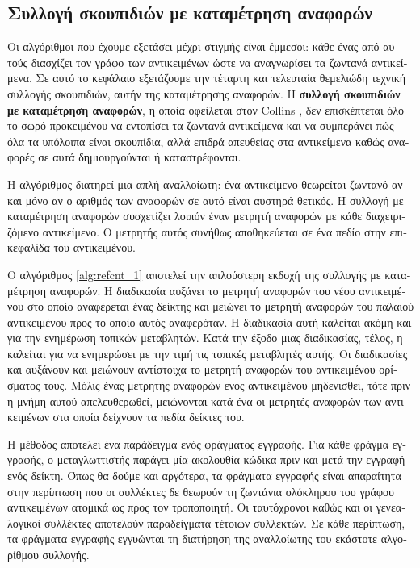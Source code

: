 \begin{greek}
\chapter{Συλλογή σκουπιδιών με καταμέτρηση αναφορών}\label{ch:refcnt}
Οι αλγόριθμοι που έχουμε εξετάσει μέχρι στιγμής είναι έμμεσοι:
κάθε ένας από αυτούς διασχίζει τον γράφο των αντικειμένων
ώστε να αναγνωρίσει τα ζωντανά αντικείμενα. Σε αυτό το κεφάλαιο
εξετάζουμε την τέταρτη και τελευταία θεμελιώδη τεχνική συλλογής
σκουπιδιών, αυτήν της καταμέτρησης αναφορών.  
Η \textbf{συλλογή σκουπιδιών με καταμέτρηση αναφορών}, η
οποία οφείλεται στον Collins \cite{DBLP:journals/cacm/Collins60},
δεν επισκέπτεται όλο το σωρό προκειμένου να εντοπίσει τα
ζωντανά αντικείμενα και να συμπεράνει πώς όλα τα υπόλοιπα
είναι σκουπίδια, αλλά επιδρά απευθείας στα αντικείμενα
καθώς αναφορές σε αυτά δημιουργούνται ή καταστρέφονται.

Η αλγόριθμος διατηρεί μια απλή αναλλοίωτη: ένα αντικείμενο
θεωρείται ζωντανό αν και μόνο αν ο αριθμός των αναφορών σε
αυτό είναι αυστηρά θετικός. Η συλλογή με καταμέτρηση αναφορών
συσχετίζει λοιπόν έναν μετρητή αναφορών με κάθε διαχειριζόμενο
αντικείμενο. Ο μετρητής αυτός συνήθως αποθηκεύεται σε ένα
πεδίο στην  επικεφαλίδα του αντικειμένου.

Ο αλγόριθμος \ref{alg:refcnt_1} αποτελεί την απλούστερη
εκδοχή της συλλογής με καταμέτρηση αναφορών. Η διαδικασία
\textenglish{} αυξάνει το μετρητή αναφορών του νέου
αντικειμένου στο οποίο αναφέρεται ένας δείκτης και μειώνει
το μετρητή αναφορών του παλαιού αντικειμένου προς το οποίο
αυτός αναφερόταν. Η διαδικασία αυτή καλείται ακόμη και για
την ενημέρωση τοπικών μεταβλητών. Κατά την έξοδο μιας
διαδικασίας, τέλος, η \textenglish{} καλείται για να
ενημερώσει με την τιμή \null τις τοπικές μεταβλητές αυτής.
Οι διαδικασίες \textenglish{} και \textenglish{}
αυξάνουν και μειώνουν αντίστοιχα το μετρητή αναφορών του
αντικειμένου ορίσματος τους. Μόλις ένας μετρητής αναφορών
ενός αντικειμένου μηδενισθεί, τότε πριν η μνήμη αυτού
απελευθερωθεί, μειώνονται κατά ένα οι μετρητές αναφορών
των αντικειμένων στα οποία δείχνουν τα πεδία δείκτες
του.

Η μέθοδος \textenglish{} αποτελεί ένα παράδειγμα ενός φράγματος
εγγραφής. Για κάθε φράγμα εγγραφής, ο μεταγλωττιστής παράγει
μία ακολουθία κώδικα πριν και μετά την εγγραφή ενός δείκτη.
Όπως θα δούμε και αργότερα, τα φράγματα εγγραφής είναι
απαραίτητα στην περίπτωση που οι συλλέκτες δε θεωρούν τη
ζωντάνια ολόκληρου του γράφου αντικειμένων ατομικά ως προς
τον τροποποιητή. Οι ταυτόχρονοι καθώς και οι γενεαλογικοί
συλλέκτες αποτελούν παραδείγματα τέτοιων συλλεκτών. Σε κάθε
περίπτωση, τα φράγματα εγγραφής εγγυώνται τη διατήρηση της
αναλλοίωτης του εκάστοτε αλγορίθμου συλλογής.


\end{greek}
